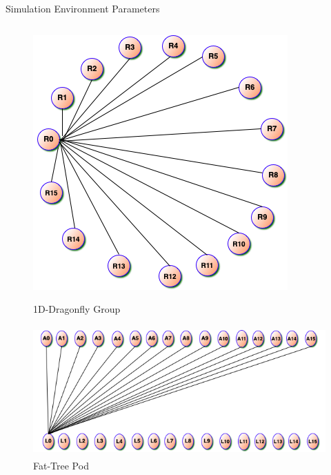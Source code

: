\documentclass[final]{beamer}
\newlength{\sepwidth}
\newcommand{\separatorcolumn}{\begin{column}{\sepwidth}\end{column}}
\begin{document}
\begin{frame}[t]
\begin{columns}[t]
\begin{column}{0.5\textwidth}
\begin{block}{Simulation Environment Parameters}
\begin{column}{0.3\textwidth}
  \begin{figure}
\centering
\begin{minipage}[t][2cm][t]{.40\textwidth}
\centering
\includegraphics[width=\linewidth]{figs/1Dgroup.png}
\caption{1D-Dragonfly Group}
\label{fig:13a}
\end{minipage}
\separatorcolumn
\begin{minipage}[t][2cm][t]{.40\textwidth}
\centering
\includegraphics[width=1\linewidth,height=5cm]{figs/fat-tree.png}
\caption{Fat-Tree Pod}
\label{fig:13b}
\end{minipage}
\end{figure}



\begin{table}


\end{table}
\end{column}
\end{block}
\end{column}
\end{columns}
\end{frame}
\end{document}
